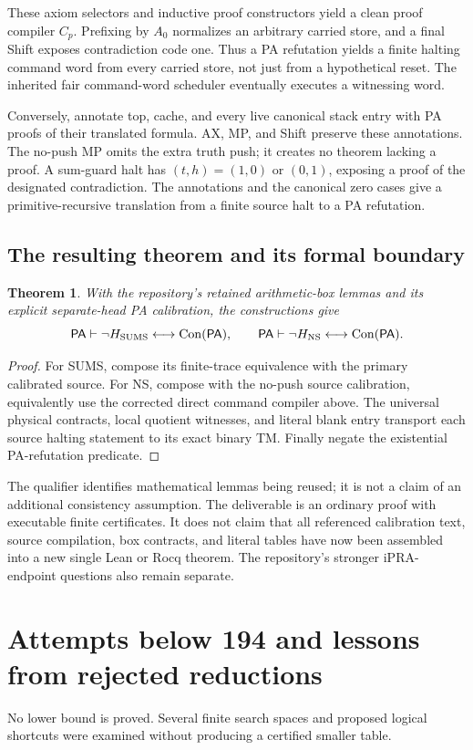 \documentclass[11pt,a4paper]{article}
\newcommand{\PA}{\mathsf{PA}}
\newcommand{\Con}{\operatorname{Con}}
\newtheorem{theorem}{Theorem}
\begin{document}
These axiom selectors and inductive proof constructors
yield a clean proof compiler $C_p$. Prefixing by $A_0$ normalizes an
arbitrary carried store, and a final Shift exposes contradiction code
one. Thus a PA refutation yields a finite halting command word from
every carried store, not just from a hypothetical reset. The inherited
fair command-word scheduler eventually executes a witnessing word.

Conversely, annotate top, cache, and every live canonical stack entry
with PA proofs of their translated formula. AX, MP, and Shift preserve
these annotations. The no-push MP omits the extra truth push;
it creates no theorem lacking a proof. A sum-guard halt has
$(t,h)=(1,0)$ or $(0,1)$, exposing a proof of the designated contradiction.
The annotations and the canonical zero cases give a primitive-recursive
translation from a finite source halt to a PA refutation.

\subsection{The resulting theorem and its formal boundary}
\begin{theorem}
With the repository's retained arithmetic-box lemmas and its explicit
separate-head PA calibration, the constructions give
\[
 \PA\vdash
  \neg H_{\rm SUMS}\longleftrightarrow\Con(\PA),
 \qquad
 \PA\vdash
  \neg H_{\rm NS}\longleftrightarrow\Con(\PA).
\]
\end{theorem}
\begin{proof}
For SUMS, compose its finite-trace equivalence with the primary calibrated
source. For NS, compose with the no-push source calibration, equivalently
use the corrected direct command compiler above. The universal physical
contracts, local quotient witnesses, and literal blank entry transport
each source halting statement to its exact binary TM. Finally negate
the existential PA-refutation predicate.
\end{proof}

The qualifier identifies mathematical lemmas being reused; it is not a
claim of an additional consistency assumption. The deliverable is an
ordinary proof with executable finite certificates. It does not claim
that all referenced calibration text, source compilation, box contracts,
and literal tables have now been assembled into a new single Lean or
Rocq theorem. The repository's stronger iPRA-endpoint questions also
remain separate.

\section{Attempts below 194 and lessons from rejected reductions}
No lower bound is proved. Several finite search spaces and proposed
logical shortcuts were examined without producing a certified smaller
table.
\end{document}
